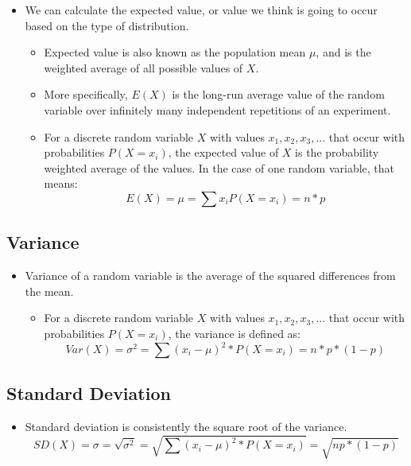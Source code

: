 \documentclass[
  letterpaper,
  DIV=11,
  numbers=noendperiod]{scrreprt}
\providecommand{\tightlist}{%
  \setlength{\itemsep}{0pt}\setlength{\parskip}{0pt}}\usepackage{longtable,booktabs,array}
\begin{document}
\begin{itemize}
\tightlist
\item
  We can calculate the expected value, or value we think is going to
  occur based on the type of distribution.

  \begin{itemize}
  \tightlist
  \item
    Expected value is also known as the population mean \(\mu\), and is
    the weighted average of all possible values of \(X\).
  \item
    More specifically, \(E(X)\) is the long-run average value of the
    random variable over infinitely many independent repetitions of an
    experiment.
  \item
    For a discrete random variable \(X\) with values
    \(x_1, x_2, x_3, ...\) that occur with probabilities \(P(X=x_i)\),
    the expected value of \(X\) is the probability weighted average of
    the values. In the case of one random variable, that means:
    \[E(X) = \mu = \sum{x_iP(X=x_i)} = n*p\]
  \end{itemize}
\end{itemize}

\subsection{Variance}\label{variance-1}

\begin{itemize}
\tightlist
\item
  Variance of a random variable is the average of the squared
  differences from the mean.

  \begin{itemize}
  \tightlist
  \item
    For a discrete random variable \(X\) with values
    \(x_1, x_2, x_3, ...\) that occur with probabilities \(P(X=x_i)\),
    the variance is defined as:
    \[Var(X) = \sigma^2 = \sum{(x_i-\mu)^2*P(X=x_i)} = n*p*(1-p)\]
  \end{itemize}
\end{itemize}

\subsection{Standard Deviation}\label{standard-deviation-1}

\begin{itemize}
\tightlist
\item
  Standard deviation is consistently the square root of the variance.
  \[SD(X) = \sigma = \sqrt{\sigma^2} = \sqrt{\sum{(x_i-\mu)^2*P(X=x_i)}}= \sqrt{np*(1-p)}\]
\end{itemize}
\end{document}
